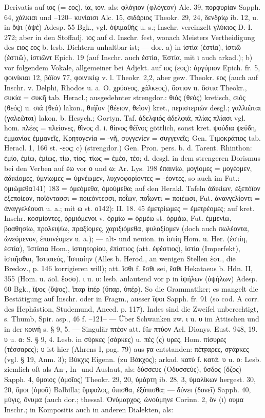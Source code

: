 Derivatis auf ιος (= εος), ία, ιον, als: φλόγιον (φλόγεον) Alc. 39, πορφυρίαν Sapph. 64, χάλκιαι und --120-- κυνίαισι Alc. 15, σιδάριος Theokr. 29, 24, δενδρίῳ ib. 12, u. in ὄψι (ὀψέ) Adesp. 55 Bgk., vgl. ὀψιμαθής u. s.; Inschr. vereinzelt γλύκιος D.-I. 272; aber in den Stoffadj. ιος auf d. Inschr. fest, wonach Meisters Vertheidigung des ειος εος b. lesb. Dichtern unhaltbar ist; — dor. a) in ἱστία (ἑστία), ἱστιῶ (ἑστιῶ), ἱστιῶντ Epich. 19 (auf Inschr. auch ἑστία, Ἑστία, mit ι auch  arkad.); b) vor folgendem Vokale, allgemeiner bei Adjekt. auf ιος (εος): ἀργύριον Epich. fr. 5, φοινίκιαι 12, βόϊον 77, φοινικίῳ v. l. Theokr. 2,2, aber gew. Theokr. εος (auch auf Inschr. v. Delphi, Rhodos u. a. O. χρύσεος, χάλκεος), ὄστιον u. ὄστια Theokr., συκία = συκῆ tab. Heracl.; ausgedehnter strengdor.: θιός (θεός) kretisch, σιός (θεός) u. σιά (θεά) lakon., θιήϊον (θέειον, θεῖον) kret., περιστεριών desgl.; γαλλιῶται (γαλεῶται) lakon. b. Hesych.; Gortyn. Taf. ἀδελφιός ἀδελφιά, πλίας πλίασι vgl. hom. πλέες = πλείονες, θῖνος d. i. θίινος θέϊνος göttlich, sonst kret. ψούδια ψεύδη, ἐμμανίας ἐμμανεῖς, Κρητογενία = -νῆ, συγγενίεν = συγγενεῖς; Gen. Τιμοκράτιος tab. Heracl. 1, 166 st. -εος; c) (strengdor.) Gen. Pron. pers. b. d. Tarent. Rhinthon: ἐμίο, ἐμίω, ἐμίως, τίω, τίος, τίως = ἐμέο, τέο; d. desgl. in dem strengeren Dorismus bei den Verben auf έω vor ο und ω: Ar. Lys. 198 ἐπαινίω, μογίομες = μογέομεν, ἀδικίομες, ὑμνίωμες = ὑμνέωμεν, λυχνοφορίοντες = -έοντες, so auch im Fut.: ὀμιώμεθα141) 183 = ὀμεόμεθα, ὀμούμεθα; auf den Herakl. Tafeln ἀδικίων, ἐξεπόϊον ἐξεποίεον, ποϊόντασσι = ποιεόντεσσι, ποΐων, ποΐωντι = ποιέωσι, Fut. ἀνανγελίοντι = ἀναγγελέουσι u. a.; mit ω st. ο142): II. 18. 45 ἐμετρίωμες = ἐμετρέομες; auf kret. Inschr. κοσμίοντες, ὁρμιόμενοι v. ὁρμίω = ὁρμέω st. ὁρμάω, Fut. ἐμμενίω, βοαθησίω, προλειψίω, πραξίομες, χαριξιόμεθα, φυλαξίομεν (doch auch πωλέοντα, ὠνεόμενον, ἐπαινέομεν u. a.); — alt- und neuion. in ἱστίη Hom. u. Her. (ἑστίη, ἑστία), Ἱστίαια Hom., ἱστιητορίου, ἐπίστιος (att. ἐφέστιος), ἱστία (Imperfekt), ἱστιῆσθαι, Ἱστιαιεύς, Ἱστιαίην (Alles b. Herod., an wenigen Stellen ἑστ., die Bredov., p. 146 korrigieren will); att. ἴσθι f. ἔσθι sei, ἔσθι Hekataeus b. Hdn. II, 355 (Hom. u. äol. ἔσσο). ι u. υ: lesb. anlautend vor p in ἰψήλων (ὑψήλων) Adesp. 60 Bgk., ἴψος (ὕψος), ἴπαρ ἰπέρ (ὕπαρ, ὑπέρ). So die Grammatiker; es mangelt die Bestätigung auf Inschr. oder in Fragm., ausser ἴψοι Sapph. fr. 91 (so cod. A corr. des Hephästion, Studemund, Anecd. p. 117). Indes sind die Zweifel unberechtigt, s. Thumb, Spir. asp., 46 f. --121-- — Über Schwanken zw. ι u. υ im Attischen und in der κοινή s. § 9, 5. — Singulär πτέον att. für πτύον Ael. Dionys. Eust. 948, 19. υ u. α: S. § 9, 4. Lesb. in σύρκες (σάρκες) u. πές (ς) υρες, Hom. πίσυρες (τέσσαρες); υ ist hier (Ahrens I, pag. 79) aus ϝα entstanden: πέτϝαρες, σϝάρκες (vgl. § 19, Anm. 3); Βύκχις Eigenn. (zu Βάκχος); arkad. κατύ f. κατά. υ u. ο: Lesb. ziemlich oft als An-, In- und Auslaut, als: δύσσευς (Οδυσσεύς), ὔσδος (ὄζος) Sapph. 4, ὔμοιος (ὁμοῖος) Theokr. 29, 20, ὐμάρτη ib. 28, 3, ὐμαλίκων hergest. 30, 20, ὔμοι (ὁμοῦ) Balbilla; ὔμφαλος, ὔπισθα, ἐξύπισθα; — δύνει (δονεῖ) Sapph. 40, μύγις, ὄνυμα (auch dor.; thessal. Ὀνύμαρχος,  ὠνούμηνε Corinn. 2, ὄν (ι) ουμα Inschr.; in Kompositis auch in anderen Dialekten, als: 